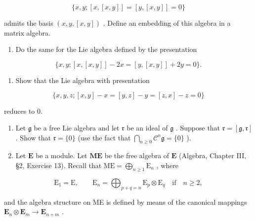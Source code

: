 \[
\{x, y; [ x, [ x, y ] ] = [ y, [ x, y ] ] = 0 \}
\]

admits the basis \((x,y,[x,y])\) . Define an embedding of this algebra in a matrix algebra.

\begin{enumerate}
\def\labelenumi{(\alph{enumi})}
\setcounter{enumi}{1}
\tightlist
\item
  Do the same for the Lie algebra defined by the presentation
\end{enumerate}

\[
\{x, y; [ x, [ x, y ] ] - 2 x = [ y, [ x, y ] ] + 2 y = 0 \}.
\]

\begin{enumerate}
\def\labelenumi{(\alph{enumi})}
\setcounter{enumi}{2}
\tightlist
\item
  Show that the Lie algebra with presentation
\end{enumerate}

\[
\{x, y, z; [ x, y ] - x = [ y, z ] - y = [ z, x ] - z = 0 \}
\]

reduces to 0.

\begin{enumerate}
\def\labelenumi{\arabic{enumi}.}
\setcounter{enumi}{4}
\item
  Let \(\mathfrak{g}\) be a free Lie algebra and let \(\mathfrak{r}\) be an ideal of \(\mathfrak{g}\) . Suppose that \(\mathfrak{r} = [\mathfrak{g},\mathfrak{r}]\) . Show that \(\mathfrak{r} = \{0\}\) (use the fact that \(\bigcap_{n\geqslant 0}\mathcal{C}^n\mathfrak{g} = \{0\}\) ).
\item
  Let \(\mathbf{E}\) be a module. Let \(\mathbf{ME}\) be the free algebra of \(\mathbf{E}\) (Algebra, Chapter III, §2, Exercise 13). Recall that \(\mathrm{ME} = \bigoplus_{n\geqslant 1}\mathrm{E}_n\) , where
\end{enumerate}

\[
\mathrm{E} _ {1} = \mathrm{E}, \qquad \mathrm{E} _ {n} = \bigoplus_ {p + q = n} \mathrm{E} _ {p} \otimes \mathrm{E} _ {q} \quad \text {if} \quad n \geqslant 2,
\]

and the algebra structure on ME is defined by means of the canonical mappings \(\mathbf{E}_n\otimes \mathbf{E}_m\to \mathbf{E}_{n + m}\) .

